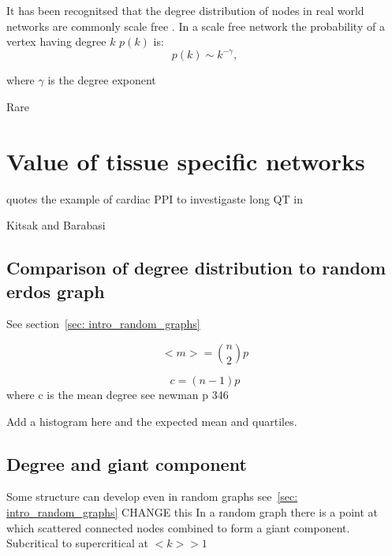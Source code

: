 It has been recognitsed that the degree distribution of nodes in real world networks are commonly scale free \cite{barabasi1999emergence} \cite{barabasi1999mean}. In a scale free network the probability of a vertex having degree $k$ $p(k)$ is:
\begin{equation}
    p(k) \sim k^{-\gamma},
\end{equation}
\label{eq:scale free}

where $\gamma$ is the degree exponent \cite{barabasi2016network}

Rare \cite{broido2019scale}






\section{Value of tissue specific networks}
\cite{parikshak2015systems} quotes the example of cardiac PPI to investigaste long QT in \cite{lundby2014annotation}

Kitsak and Barabasi \cite{kitsak2016tissue}

\subsection{Comparison of degree distribution to random erdos graph}
See section~\ref{sec: intro_random_graphs}

\begin{equation}
    <m> = \binom{n}{2}p
\end{equation}


\begin{equation}
    c = (n-1)p
\end{equation}
where c is the mean degree see newman p 346

Add a histogram here and the expected mean and quartiles.


\subsection{Degree and giant component}
\label{sec:connected component and degree}
Some structure can develop even in random graphs see~\ref{sec: intro_random_graphs}
 CHANGE this
In a random graph there is a point at which scattered connected nodes combined to form a giant component. Subcritical to supercritical at $<k> >1$


